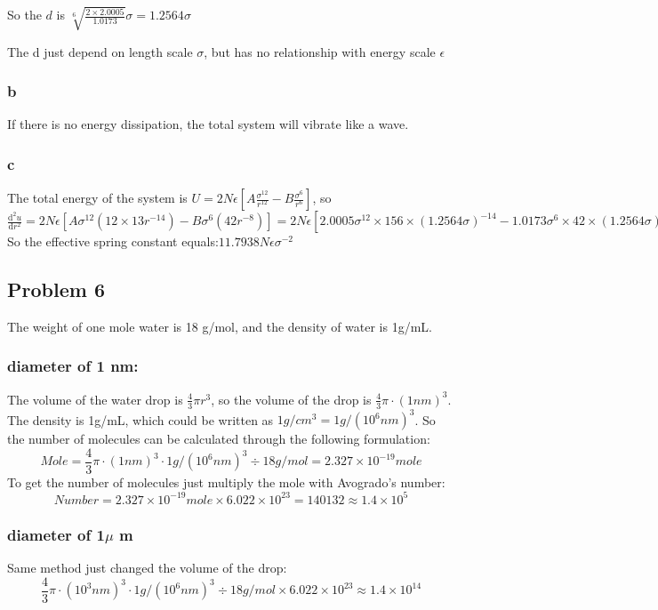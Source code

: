 \documentclass[a4paper]{article}
\begin{document}
So the $d$ is $\sqrt[6]{\frac{2 \times 2.0005}{1.0173}} \sigma=1.2564 \sigma$

The d just depend on length scale $\sigma$, but has no relationship with energy scale $\epsilon$

\subsubsection{b}
If there is no energy dissipation, the total system will vibrate like a wave. 

\subsubsection{c}
The total energy of the system is $U=2N \epsilon [A\frac{\sigma^{12}}{r^{12}}-B\frac{\sigma^{6}}{r^{6}}]$, so $\frac{\mathrm{d^{2}}u}{\mathrm{d}r^{2}}=2N \epsilon [A \sigma^{12}(12 \times 13 r^{-14})-B \sigma^{6}(42 r^{-8})]=2N\epsilon [2.0005\sigma^{12} \times 156 \times(1.2564 \sigma)^{-14}-1.0173\sigma^{6}\times 42 \times (1.2564 \sigma)^{-8}]$
So the effective spring constant equals:$11.7938N\epsilon \sigma^{-2}$

\subsection{Problem 6}
The weight of one mole water is 18 g/mol, and the density of water is 1g/mL.
\subsubsection{diameter of 1 nm:} The volume of the water drop is $\frac{4}{3}\pi r^{3}$, so the volume of the drop is $\frac{4}{3}\pi \cdot (1 nm)^{3}$. The density is 1g/mL, which could be written as $1g/cm^{3}=1g/(10^{6}nm)^{3}$. So the number of molecules can be calculated through the following formulation:
\begin{equation}
	Mole=\frac{4}{3}\pi \cdot (1 nm)^{3} \cdot 1g/(10^{6}nm)^{3} \div 18 g/mol=2.327 \times 10^{-19} mole 
\end{equation}
To get the number of molecules just multiply the mole with Avogrado's number:
\begin{equation}
	Number =2.327 \times 10^{-19} mole \times 6.022 \times 10^{23}=140132 \approx 1.4 \times 10^{5}
\end{equation}

\subsubsection{diameter of 1$\mu$ m}
Same method just changed the volume of the drop:
\begin{equation}
	\frac{4}{3}\pi \cdot (10^{3} nm)^{3} \cdot 1g/(10^{6}nm)^{3} \div 18 g/mol \times 6.022 \times 10^{23} \approx 1.4 \times 10^{14}
\end{equation}
\end{document}
